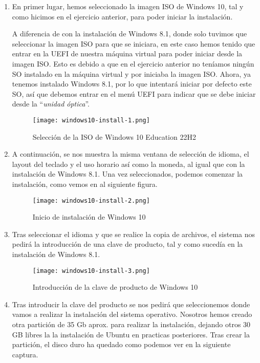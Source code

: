 \begin{enumerate}
    \item En primer lugar, hemos seleccionado la imagen ISO de Windows 10, tal y como hicimos en el ejercicio anterior, para poder iniciar la instalación.

    A diferencia de con la instalación de Windows 8.1, donde solo tuvimos que seleccionar la imagen ISO para que se iniciara, en este caso hemos tenido que entrar en la UEFI  de nuestra máquina virtual para poder iniciar desde la imagen ISO. Esto es debido a que en el ejercicio anterior no teníamos ningún SO instalado en la máquina virtual y por iniciaba la imagen ISO. Ahora, ya tenemos instalado Windows 8.1, por lo que intentará iniciar por defecto este SO, así que debemos entrar en el menú UEFI para indicar que se debe iniciar desde la ``\textit{unidad óptica}''.

    \begin{figure}[H]
        \centering
        \texttt{[image: windows10-install-1.png]}
        \caption{Selección de la ISO de Windows 10 Education 22H2}
    \end{figure}

    \item A continuación, se nos muestra la misma ventana de selección de idioma, el layout del teclado y el uso horario así como la moneda, al igual que con la instalación de Windows 8.1. Una vez seleccionados, podemos comenzar la instalación, como vemos en al siguiente figura.

    \begin{figure}[H]
        \centering
        \texttt{[image: windows10-install-2.png]}
        \caption{Inicio de instalación de Windows 10}
    \end{figure}

    \item Tras seleccionar el idioma y que se realice la copia de archivos, el sistema nos pedirá la introducción de una clave de producto, tal y como sucedía en la instalación de Windows 8.1.

    \begin{figure}[H]
        \centering
        \texttt{[image: windows10-install-3.png]}
        \caption{Introducción de la clave de producto de Windows 10}
    \end{figure}

    \item Tras introducir la clave del producto se nos pedirá que seleccionemos donde vamos a realizar la instalación del sistema operativo. Nosotros hemos creado otra partición de 35 Gb aprox. para realizar la instalación, dejando otros 30 GB libres la la instalación de Ubuntu en practicas posteriores. Tras crear la partición, el disco duro ha quedado como podemos ver en la siguiente captura.


\end{enumerate}
